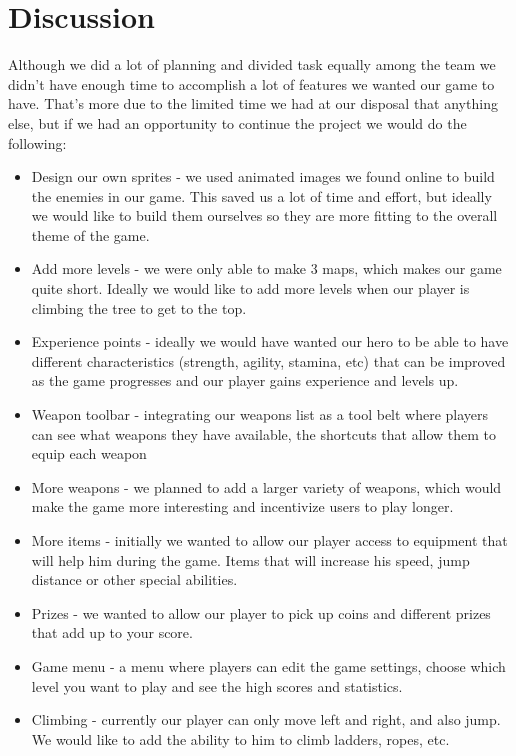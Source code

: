 \documentclass[12p]{article}
\begin{document}

\newpage
\section{Discussion} \label{Discussion}

Although we did a lot of planning and divided task equally among the team we didn't have enough time to accomplish a lot of features we wanted our game to have. That's more due to the limited time we had at our disposal that anything else, but if we had an opportunity to continue the project we would do the following:

\begin{itemize}
    \item Design our own sprites - we used animated images we found online to build the enemies in our game. This saved us a lot of time and effort, but ideally we would like to build them ourselves so they are more fitting to the overall theme of the game.
    \item Add more levels - we were only able to make 3 maps, which makes our game quite short. Ideally we would like to add more levels when our player is climbing the tree to get to the top.
    \item Experience points - ideally we would have wanted our hero to be able to have different characteristics (strength, agility, stamina, etc) that can be improved as the game progresses and our player gains experience and levels up.
    \item Weapon toolbar - integrating our weapons list as a tool belt where players can see what weapons they have available, the shortcuts that allow them to equip each weapon 
    \item More weapons - we planned to add a larger variety of weapons, which would make the game more interesting and incentivize users to play longer.
    \item More items - initially we wanted to allow our player access to equipment that will help him during the game. Items that will increase his speed, jump distance or other special abilities.
    \item Prizes - we wanted to allow our player to pick up coins and different prizes that add up to your score.
    \item Game menu - a menu where players can edit the game settings, choose which level you want to play and see the high scores and statistics.
    \item Climbing - currently our player can only move left and right, and also jump. We would like to add the ability to him to climb ladders, ropes, etc.
\end{itemize}
\end{document}
